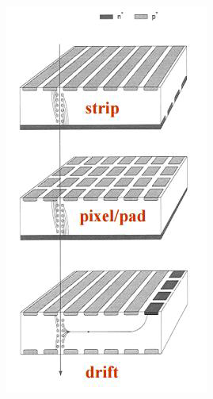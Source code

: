 \begin{minipage}{0.39\textwidth}
   \begin{figure}[H]
      \centering
      \includegraphics[width=\textwidth]{immagini/Tipi_rivelatore_al_silicio.png}
   \end{figure}
\end{minipage}
